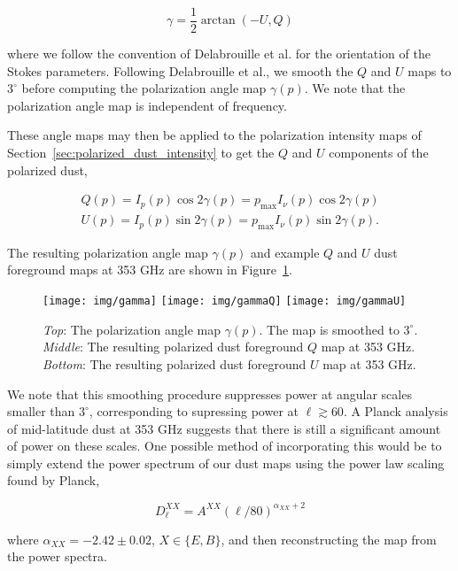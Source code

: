 \documentclass[twoside,10pt]{article}
\begin{document}
\begin{equation}
    \gamma = \frac{1}{2} \arctan{\left( -U, Q \right)}
\end{equation}

where we follow the convention of Delabrouille et al. for the orientation of
the Stokes parameters. Following Delabrouille et al., we smooth the $Q$ and
$U$ maps to $3^\circ$ before computing the polarization angle map $\gamma(p)$.
We note that the polarization angle map is independent of frequency.

These angle maps may then be applied to the polarization intensity maps of
Section~\ref{sec:polarized_dust_intensity} to get the $Q$ and $U$ components
of the polarized dust,

\begin{align}
    Q(p) = I_p(p) \cos{2\gamma(p)} = p_\mathrm{max} I_\nu(p) \cos{2\gamma(p)}\\
    U(p) = I_p(p) \sin{2\gamma(p)} = p_\mathrm{max} I_\nu(p) \sin{2\gamma(p)}.
\end{align}

The resulting polarization angle map $\gamma(p)$ and example $Q$ and $U$ dust
foreground maps at 353 GHz are shown in Figure~\ref{fig:gammaQU}.

\begin{figure}[th]
    \begin{center}
        \texttt{[image: img/gamma]}
        \texttt{[image: img/gammaQ]}
        \texttt{[image: img/gammaU]}
    \end{center}
    \caption{\emph{Top}: The polarization angle map $\gamma(p)$. The map is
    smoothed to $3^\circ$. \emph{Middle}: The resulting polarized dust
    foreground $Q$ map at 353 GHz. \emph{Bottom}: The resulting polarized
    dust foreground $U$ map at 353 GHz.}
    \label{fig:gammaQU}
\end{figure}

We note that this smoothing procedure suppresses power at angular scales
smaller than $3^\circ$, corresponding to supressing power at $\ell \gtrsim
60$. A Planck analysis\cite{planck_collaboration_planck_2014-2} of
mid-latitude dust at 353 GHz suggests that there is still a significant amount
of power on these scales. One possible method of incorporating this would be
to simply extend the power spectrum of our dust maps using the power law
scaling found by Planck,

\begin{equation}
    D_\ell^{X\!X} = A^{X\!X}(\ell/80)^{\alpha_{X\!X} + 2}
\end{equation}

where $\alpha_{X\!X} = -2.42 \pm 0.02$, $X \in \{E, B\}$, and then
reconstructing the map from the power spectra.



\end{document}
